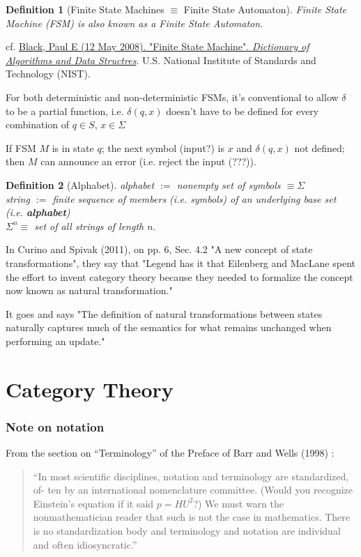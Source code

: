 \documentclass[10pt]{amsart}
\newtheorem{definition}{Definition}
\begin{document}
\begin{multicols*}{2}
\begin{definition}[Finite State Machines $\equiv$ Finite State Automaton]
	Finite State Machine (FSM) is also known as a Finite State Automaton.
\end{definition}
cf. \href{https://xlinux.nist.gov/dads/HTML/finiteStateMachine.html}{Black, Paul E (12 May 2008). "Finite State Machine". \emph{Dictionary of Algorithms and Data Structres}}. U.S. National Institute of Standards and Technology (NIST).

For both deterministic and non-deterministic FSMs, it's conventional to allow $\delta$ to be a partial function, i.e. 
$\delta(q,x)$ doesn't have to be defined for every combination of $q \in S$, $x \in \Sigma$

If FSM $M$ is in state $q$; the next symbol (input?) is $x$ and $\delta(q,x)$ not defined; then $M$ can announce an error (i.e. reject the input (???)). 


\begin{definition}[Alphabet]
	alphabet $:= $ nonempty set of symbols $\equiv \Sigma$ \\
	string $:=$ finite sequence of members (i.e. symbols) of an underlying base set (i.e. \textbf{alphabet}) \\
	$\Sigma^n \equiv $ set of all strings of length $n$.
\end{definition}

In Curino and Spivak (2011)\cite{SpCu2011}, on pp. 6, Sec. 4.2 "A new concept of state transformations", they say that "Legend has it that Eilenberg and MacLane spent the effort to invent category theory because they needed to formalize the concept now known as natural transformation." 

It goes and says "The definition of natural transformations between states naturally captures much of the semantics for what remains unchanged when performing an update."



\part{Category Theory}

\section{Note on notation}

From the section on ``Terminology'' of the Preface of Barr and Wells (1998) \cite{BW1998}:

\begin{quote}
	``In most scientific disciplines, notation and terminology are standardized, of- ten by an international nomenclature committee. (Would you recognize Einstein’s equation if it said $p = HU^2$?) We must warn the nonmathematician reader that such is not the case in mathematics. There is no standardization body and terminology and notation are individual and often idiosyncratic.''
\end{quote}


\end{multicols*}
\end{document}

